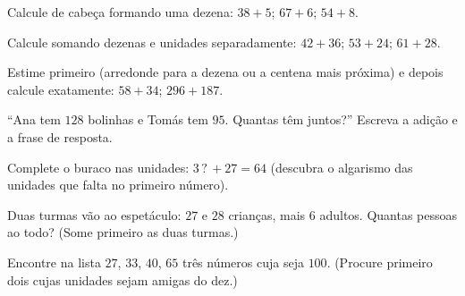 \begin{exercise}[$\star$]\label{exo:g2:addition:4}
Calcule de cabeça formando uma dezena: $38 + 5$; \quad $67 + 6$;
\quad $54 + 8$.
\end{exercise}

\begin{exercise}[$\star$]\label{exo:g2:addition:5}
Calcule somando dezenas e unidades separadamente: $42 + 36$; \quad
$53 + 24$; \quad $61 + 28$.
\end{exercise}

\begin{exercise}[$\star$]\label{exo:g2:addition:6}
Estime primeiro (arredonde para a dezena ou a centena mais próxima)
e depois calcule exatamente: $58 + 34$; \quad $296 + 187$.
\end{exercise}

\begin{exercise}[$\star$]\label{exo:g2:addition:7}
``Ana tem $128$ bolinhas e Tomás tem $95$. Quantas têm juntos?''
Escreva a adição e a frase de resposta.
\end{exercise}

\begin{exercise}[$\star$]\label{exo:g2:addition:8}
Complete o buraco nas unidades: $3\,?\, + 27 = 64$ (descubra o
algarismo das unidades que falta no primeiro número).
\end{exercise}

\begin{exercise}[$\star$]\label{exo:g2:addition:9}
Duas turmas vão ao espetáculo: $27$ e $28$ crianças, mais $6$
adultos. Quantas pessoas ao todo? (Some primeiro as duas turmas.)
\end{exercise}

\begin{exercise}[$\star\star$]\label{exo:g2:addition:10}
Encontre na lista $27$, $33$, $40$, $65$ três números cuja  seja
$100$. (Procure primeiro dois cujas unidades sejam amigas do dez.)
\end{exercise}
